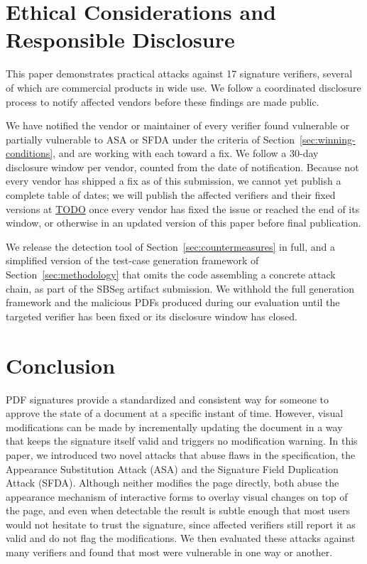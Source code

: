 \documentclass[12pt]{article}
\begin{document}
\section{Ethical Considerations and Responsible Disclosure} \label{sec:ethics}

This paper demonstrates practical attacks against 17 signature verifiers, several of which are commercial products in wide use. We follow a coordinated disclosure process to notify affected vendors before these findings are made public.

We have notified the vendor or maintainer of every verifier found vulnerable or partially vulnerable to ASA or SFDA under the criteria of Section~\ref{sec:winning-conditions}, and are working with each toward a fix. We follow a 30-day disclosure window per vendor, counted from the date of notification. Because not every vendor has shipped a fix as of this submission, we cannot yet publish a complete table of dates; we will publish the affected verifiers and their fixed versions at \url{TODO} once every vendor has fixed the issue or reached the end of its window, or otherwise in an updated version of this paper before final publication. %

We release the detection tool of Section~\ref{sec:countermeasures} in full, and a simplified version of the test-case generation framework of Section~\ref{sec:methodology} that omits the code assembling a concrete attack chain, as part of the SBSeg artifact submission. We withhold the full generation framework and the malicious PDFs produced during our evaluation until the targeted verifier has been fixed or its disclosure window has closed.


\section{Conclusion} \label{sec:conclusion}

PDF signatures provide a standardized and consistent way for someone to approve the state of a document at a specific instant of time. However, visual modifications can be made by incrementally updating the document in a way that keeps the signature itself valid and triggers no modification warning. In this paper, we introduced two novel attacks that abuse flaws in the specification, the Appearance Substitution Attack (ASA) and the Signature Field Duplication Attack (SFDA). Although neither modifies the page directly, both abuse the appearance mechanism of interactive forms to overlay visual changes on top of the page, and even when detectable the result is subtle enough that most users would not hesitate to trust the signature, since affected verifiers still report it as valid and do not flag the modifications. We then evaluated these attacks against many verifiers and found that most were vulnerable in one way or another.
\end{document}

